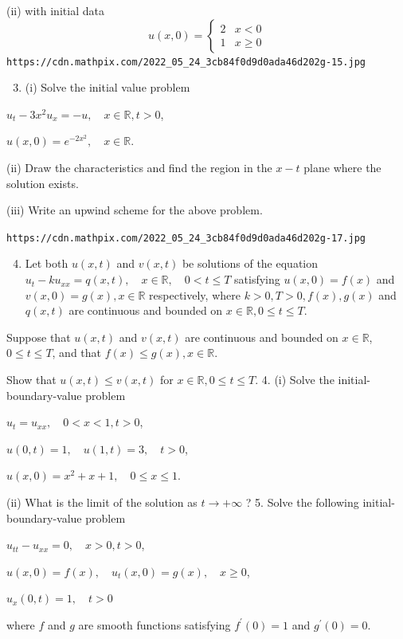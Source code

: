 \documentclass[10pt]{article}
\begin{document}
(ii) with initial data
$$
u(x, 0)= \begin{cases}2 & x<0 \\ 1 & x \geq 0\end{cases}
$$
\texttt{https://cdn.mathpix.com/2022_05_24_3cb84f0d9d0ada46d202g-15.jpg}

\begin{enumerate}
  \setcounter{enumi}{2}
  \item (i) Solve the initial value problem
\end{enumerate}
$u_{t}-3 x^{2} u_{x}=-u, \quad x \in \mathbb{R}, t>0$,

$u(x, 0)=e^{-2 x^{2}}, \quad x \in \mathbb{R} .$

(ii) Draw the characteristics and find the region in the $x-t$ plane where the solution exists.

(iii) Write an upwind scheme for the above problem.

\texttt{https://cdn.mathpix.com/2022_05_24_3cb84f0d9d0ada46d202g-17.jpg}

\begin{enumerate}
  \setcounter{enumi}{3}
  \item Let both $u(x, t)$ and $v(x, t)$ be solutions of the equation $u_{t}-k u_{x x}=q(x, t), \quad x \in \mathbb{R}, \quad 0<t \leq T$ satisfying $u(x, 0)=f(x)$ and $v(x, 0)=g(x), x \in \mathbb{R}$ respectively, where $k>0, T>0, f(x), g(x)$ and $q(x, t)$ are continuous and bounded on $x \in \mathbb{R}, 0 \leq t \leq T$.
\end{enumerate}
Suppose that $u(x, t)$ and $v(x, t)$ are continuous and bounded on $x \in \mathbb{R}$, $0 \leq t \leq T$, and that $f(x) \leq g(x), x \in \mathbb{R} .$

Show that $u(x, t) \leq v(x, t)$ for $x \in \mathbb{R}, 0 \leq t \leq T$. 4. (i) Solve the initial-boundary-value problem

$u_{t}=u_{x x}, \quad 0<x<1, t>0$,

$u(0, t)=1, \quad u(1, t)=3, \quad t>0$,

$u(x, 0)=x^{2}+x+1, \quad 0 \leq x \leq 1$.

(ii) What is the limit of the solution as $t \rightarrow+\infty$ ? 5. Solve the following initial-boundary-value problem

$u_{t t}-u_{x x}=0, \quad x>0, t>0$,

$u(x, 0)=f(x), \quad u_{t}(x, 0)=g(x), \quad x \geq 0$,

$u_{x}(0, t)=1, \quad t>0$

where $f$ and $g$ are smooth functions satisfying $f^{\prime}(0)=1$ and $g^{\prime}(0)=0$.
\end{document}
